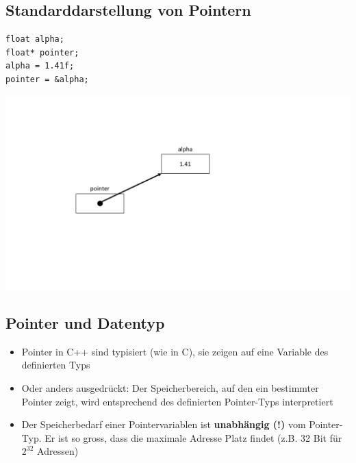 \subsection{Standarddarstellung von Pointern}
\noindent
\begin{minipage}{0.25\linewidth}
\begin{lstlisting}
float alpha;
float* pointer;
alpha = 1.41f;
pointer = &alpha;
 \end{lstlisting}
\end{minipage}
\hspace{0.01\linewidth}
\begin{minipage}{0.3\linewidth}
	\includegraphics[width=\linewidth]{images/pointer1.pdf}
\end{minipage}

\subsection{Pointer und Datentyp}
\begin{itemize}
	\item Pointer in C++ sind typisiert (wie in C), sie zeigen auf eine Variable des definierten Typs
	\item Oder anders ausgedrückt: Der Speicherbereich, auf den ein bestimmter Pointer zeigt, wird entsprechend des definierten Pointer-Typs interpretiert
	\item Der Speicherbedarf einer Pointervariablen ist \textbf{unabhängig (!)} vom Pointer-Typ. Er ist so gross, dass die maximale Adresse Platz findet (z.B. 32 Bit für $2^{32}$ Adressen)
\end{itemize}

